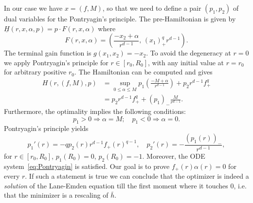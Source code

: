 \documentclass[11pt,a4paper]{article}
\numberwithin{equation}{section}
\theoremstyle{plain}
\theoremstyle{remark}
\newcommand {\f}{\frac}
\newcommand{\step}[1][]{%
  \if\relax\detokenize{#1}\relax
    \def\thisstep{.}%
  \else
    \def\thisstep{: \protect #1.}%
  \fi
  \item}
\newcommand{\impl}{\Rightarrow}
\begin{document}
%
%
%
%
%
%


In our case we have $x=(f,M)$, so that we need to define a pair $(p_1,p_2)$ of dual variables for the Pontryagin's principle. The pre-Hamiltonian is given by $\underline{H}(r,x,\alpha,p)= p\cdot F(r,x,\alpha)$ where 
$$
F(r,x,\alpha)=\left( \f{-x_2+\alpha}{r^{d-1}},\,  (x_{1})_{+}^q r^{d-1}\right).
$$
The terminal gain function is $g(x_1,x_2)=-x_2$. To avoid the degeneracy at $r=0$ we apply Pontryagin's principle for $r\in[r_0 ,R_0]$, with any initial value at $r=r_0$ for arbitrary positive $r_0$.  The Hamiltonian can be computed and gives
\begin{align*}
    H(r,(f,M),p) &= \sup_{0\le \alpha\le M}p_{1}\left( \f{-M+\alpha}{r^{d-1}}\right) + p_2 r^{d-1}f_+^q\\
    &=  p_2 r^{d-1}f_+^q + (p_{1})_-\f{M}{r^{d-1}}. 
\end{align*}
Furthermore, the optimality implies the following conditions:
\begin{equation}\label{lien p alpha}
p_1>0\impl \alpha=M ; \quad p_1<0 \impl \alpha=0.
\end{equation}
Pontryagin's principle  yields 
\begin{equation}\label{eq:p1 and p2}
    p_{1}'(r) = - qp_2(r) r^{d-1} f_{+}(r)^{q-1}, \quad  p_{2}'(r) = - \f{(p_{1}(r))_{-}}{r^{d-1}},
\end{equation}
for $r\in[r_0, R_0]$, $p_{1}(R_0)=0$, $p_{2}(R_0)=-1$. Moreover, the ODE system~\eqref{eq:Pontryagin} is satisfied.  Our goal is to prove $f_{+}(r)\alpha(r)=0$ for every $r$. If such a statement is true we can conclude that the optimizer is indeed a {\it solution} of the Lane-Emden equation till the first moment where it touches $0$, i.e. that the minimizer is a rescaling of $\bar h$.%
\end{document}
